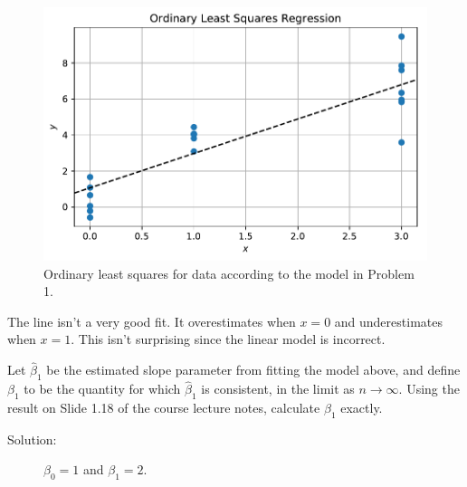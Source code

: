 \documentclass[11pt, letterpaper]{article}
\begin{document}
{\begin{enumerate}[(a)]
\begin{description}
  \begin{figure}
    \centering
    \includegraphics{p1_ols.pdf}
    \caption{Ordinary least squares for data according to the model in Problem 1.}
    \label{fig:p1_ols}
  \end{figure}

  The line isn't a very good fit. It overestimates when $x = 0$ and
  underestimates when $x = 1$. This isn't surprising since the linear model is
  incorrect.
  
\end{description}
{\item Let $\hat{\beta}_1$ be the estimated slope parameter from fitting the model above, and define $\beta_1$ to be the quantity for which $\hat{\beta}_1$ is consistent, in the limit as $n \rightarrow \infty$.  Using the result on Slide 1.18 of the course lecture notes, calculate $\beta_1$ exactly.}

\begin{description}
\item[Solution:] $\beta_0 = 1$ and $\boxed{\beta_1 = 2.}$
  

\end{description}
\end{enumerate}}
\end{document}
